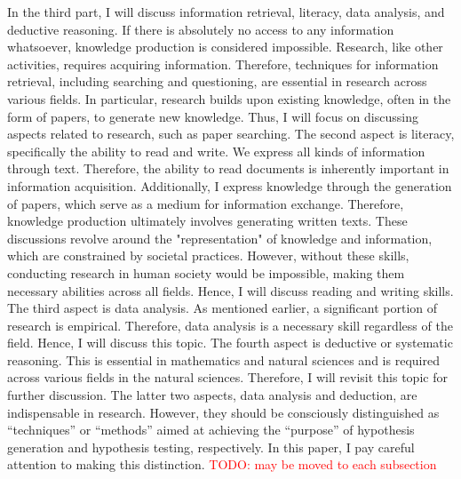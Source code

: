 \documentclass{book}
\begin{document}
In the third part, I will discuss information retrieval, literacy, data analysis, and deductive reasoning. If there is absolutely no access to any information whatsoever, knowledge production is considered impossible. Research, like other activities, requires acquiring information. Therefore, techniques for information retrieval, including searching and questioning, are essential in research across various fields. In particular, research builds upon existing knowledge, often in the form of papers, to generate new knowledge. Thus, I will focus on discussing aspects related to research, such as paper searching. The second aspect is literacy, specifically the ability to read and write. We express all kinds of information through text. Therefore, the ability to read documents is inherently important in information acquisition. Additionally, I express knowledge through the generation of papers, which serve as a medium for information exchange. Therefore, knowledge production ultimately involves generating written texts. These discussions revolve around the "representation" of knowledge and information, which are constrained by societal practices. However, without these skills, conducting research in human society would be impossible, making them necessary abilities across all fields. Hence, I will discuss reading and writing skills. The third aspect is data analysis. As mentioned earlier, a significant portion of research is empirical. Therefore, data analysis is a necessary skill regardless of the field. Hence, I will discuss this topic. The fourth aspect is deductive or systematic reasoning. This is essential in mathematics and natural sciences and is required across various fields in the natural sciences. Therefore, I will revisit this topic for further discussion. The latter two aspects, data analysis and deduction, are indispensable in research. However, they should be consciously distinguished as ``techniques'' or ``methods'' aimed at achieving the ``purpose'' of hypothesis generation and hypothesis testing, respectively. In this paper, I pay careful attention to making this distinction. \textcolor{red}{TODO: may be moved to each subsection}



\end{document}

